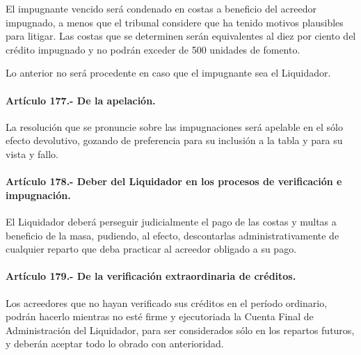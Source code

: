 \documentclass[
]{book}
\begin{document}
El impugnante vencido será condenado en costas a beneficio del acreedor impugnado, a menos que el tribunal considere que ha tenido motivos plausibles para litigar. Las costas que se determinen serán equivalentes al diez por ciento del crédito impugnado y no podrán exceder de 500 unidades de fomento.

Lo anterior no será procedente en caso que el impugnante sea el Liquidador.

\hypertarget{artuxedculo-177.--de-la-apelaciuxf3n.}{%
\paragraph*{Artículo 177.- De la apelación.}\label{artuxedculo-177.--de-la-apelaciuxf3n.}}

La resolución que se pronuncie sobre las impugnaciones será apelable en el sólo efecto devolutivo, gozando de preferencia para su inclusión a la tabla y para su vista y fallo.

\hypertarget{artuxedculo-178.--deber-del-liquidador-en-los-procesos-de-verificaciuxf3n-e-impugnaciuxf3n.}{%
\paragraph*{Artículo 178.- Deber del Liquidador en los procesos de verificación e impugnación.}\label{artuxedculo-178.--deber-del-liquidador-en-los-procesos-de-verificaciuxf3n-e-impugnaciuxf3n.}}

El Liquidador deberá perseguir judicialmente el pago de las costas y multas a beneficio de la masa, pudiendo, al efecto, descontarlas administrativamente de cualquier reparto que deba practicar al acreedor obligado a su pago.

\hypertarget{artuxedculo-179.--de-la-verificaciuxf3n-extraordinaria-de-cruxe9ditos.}{%
\paragraph*{Artículo 179.- De la verificación extraordinaria de créditos.}\label{artuxedculo-179.--de-la-verificaciuxf3n-extraordinaria-de-cruxe9ditos.}}

Los acreedores que no hayan verificado sus créditos en el período ordinario, podrán hacerlo mientras no esté firme y ejecutoriada la Cuenta Final de Administración del Liquidador, para ser considerados sólo en los repartos futuros, y deberán aceptar todo lo obrado con anterioridad.
\end{document}
